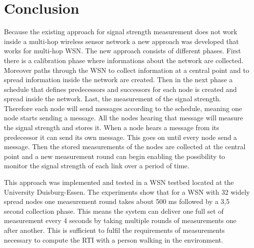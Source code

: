 \section{Conclusion}
Because the existing approach for signal strength measurement does not work inside a multi-hop wireless sensor network a new approach was developed that works for multi-hop WSN. The new approach consists of different phases. First there is a calibration phase where informations about the network are collected. Moreover paths through the WSN to collect information at a central point and to spread information inside the network are created. Then in the next phase a schedule that defines predecessors and successors for each node is created and spread inside the network. Last, the measurement of the signal strength. Therefore each node will send messages according to the schedule, meaning one node starts sending a message. All the nodes hearing that message will measure the signal strength and stores it. When a node hears a message from its predecessor it can send its own message. This goes on until every node send a message. Then the stored measurements of the nodes are collected at the central point and a new measurement round can begin enabling the possibility to monitor the signal strength of each link over a period of time.

This approach was implemented and tested in a WSN testbed located at the University Duisburg-Essen. The experiments show that for a WSN with 32 widely spread nodes one measurement round takes about 500 ms followed by a 3,5 second collection phase. This means the system can deliver one full set of measurement every 4 seconds by taking multiple rounds of measurements one after another. This is sufficient to fulfil the requirements of measurements necessary to compute the RTI with a person walking in the environment.   